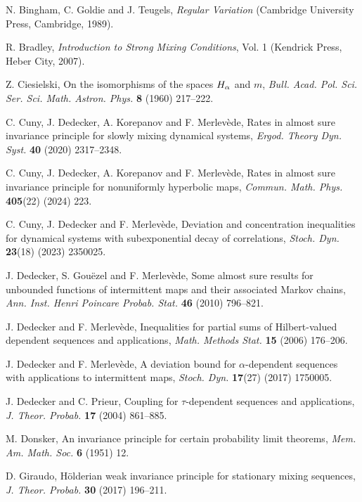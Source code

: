 \documentclass{ws-sd}
\begin{document}
\begin{thebibliography}{0}
N. Bingham, C. Goldie and J. Teugels, \textit{Regular Variation} (Cambridge University Press, Cambridge, 1989).

R. Bradley, \textit{Introduction to Strong Mixing Conditions}, Vol. 1 (Kendrick Press, Heber City,  2007).

Z. Ciesielski, On the isomorphisms of the spaces {$H\sb{\alpha }$} and {$m$}, \textit{Bull. Acad. Pol. Sci. Ser. Sci. Math. Astron. Phys.} \textbf{8} (1960) 217--222.

C. Cuny, J. Dedecker, A. Korepanov and F. Merlev\`ede, Rates in almost sure invariance principle for slowly mixing dynamical systems, \textit{Ergod. Theory Dyn. Syst.} \textbf{40} (2020) 2317--2348.

C. Cuny, J. Dedecker, A. Korepanov and F. Merlev\`ede, Rates in almost sure invariance principle for nonuniformly hyperbolic maps, \textit{Commun. Math. Phys.} \textbf{405}(22) (2024) 223.

C. Cuny, J. Dedecker and F. Merlev\`ede, Deviation and concentration inequalities for dynamical systems with subexponential decay of correlations, \textit{Stoch. Dyn.} \textbf{23}(18) (2023) 2350025.

J. Dedecker, S. Gou\"ezel and F. Merlev\`ede, Some almost sure results for unbounded functions of intermittent maps and their associated Markov chains, \textit{Ann. Inst. Henri Poincare Probab. Stat.} \textbf{46} (2010) 796--821.

J. Dedecker and F. Merlev\`ede, Inequalities for partial sums of Hilbert-valued dependent sequences and applications, \textit{Math. Methods Stat.} \textbf{15} (2006) 176--206.

J. Dedecker and F. Merlev\`ede, A deviation bound for $\alpha$-dependent sequences with applications to intermittent maps, \textit{Stoch. Dyn.} \textbf{17}(27) (2017) 1750005.

J. Dedecker and C. Prieur, Coupling for $\tau$-dependent sequences and applications, \textit{J. Theor. Probab.} \textbf{17} (2004) 861--885.

M. Donsker, An invariance principle for certain probability limit theorems, \textit{Mem. Am. Math. Soc.} \textbf{6} (1951) 12.

D. Giraudo, H\"olderian weak invariance principle for stationary mixing sequences, \textit{J. Theor. Probab.} \textbf{30} (2017) 196--211.


\end{thebibliography}
\end{document}
